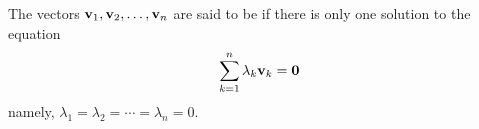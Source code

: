 \begin{dfn}
    The vectors \( \vb{v}_{1}, \vb{v}_{2}, \dots, \vb{v}_{n} \) are said to be  if there is only one solution to the equation 
    \[ \sum_{k=1}^{n} \lambda_{k} \vb{v}_{k} = \vb{0}  \]
    namely, \( \lambda_{1}= \lambda_{2} = \cdots = \lambda_{n} = 0 \).
\end{dfn}